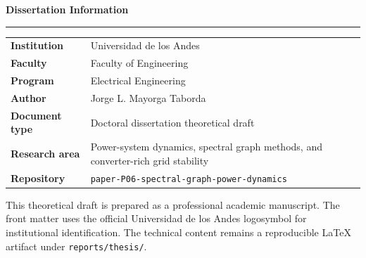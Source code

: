 \documentclass[11pt,letterpaper,oneside]{book}
\begin{document}
\cleardoublepage
\thispagestyle{empty}
\vspace*{1.0cm}
\begin{center}
{\Large\bfseries Dissertation Information\par}
\vspace{0.45cm}
{\color{uniandesyellow}\rule{0.32\textwidth}{2pt}\par}
\vspace{1.0cm}
\begin{tabular}{>{\bfseries}p{}p{}}
Institution & Universidad de los Andes\\
Faculty & Faculty of Engineering\\
Program & Electrical Engineering\\
Author & Jorge L. Mayorga Taborda\\
Document type & Doctoral dissertation theoretical draft\\
Research area & Power-system dynamics, spectral graph methods, and converter-rich grid stability\\
Repository & \texttt{paper-P06-spectral-graph-power-dynamics}\\
\end{tabular}
\end{center}
\vfill
{\small
This theoretical draft is prepared as a professional academic manuscript. The
front matter uses the official Universidad de los Andes logosymbol for
institutional identification. The technical content remains a reproducible
LaTeX artifact under \texttt{reports/thesis/}.
\par}

\cleardoublepage
\hypersetup{pageanchor=true}
\frontmatter
\end{document}
